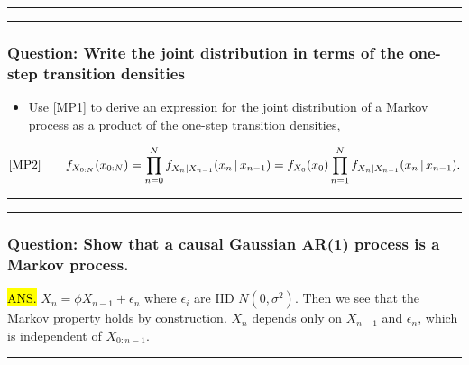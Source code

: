 \documentclass[]{article}
\providecommand{\tightlist}{%
  \setlength{\itemsep}{0pt}\setlength{\parskip}{0pt}}
\begin{document}
\begin{center}\rule{0.5\linewidth}{\linethickness}\end{center}

\begin{center}\rule{0.5\linewidth}{\linethickness}\end{center}

\subsubsection{Question: Write the joint distribution in terms of the
one-step transition
densities}\label{question-write-the-joint-distribution-in-terms-of-the-one-step-transition-densities}

\begin{itemize}
\tightlist
\item
  Use {[}MP1{]} to derive an expression for the joint distribution of a
  Markov process as a product of the one-step transition densities,
\end{itemize}

$$\text{[MP2]}
\quad\quad f_{X_{0:N}}(x_{0:N}) = \prod_{n=0}^N f_{X_n|X_{n-1}}(x_n{\, | \,} x_{n-1})=f_{X_0}(x_0)\prod_{n=1}^N f_{X_n|X_{n-1}}(x_n{\, | \,} x_{n-1}).$$


\begin{center}\rule{0.5\linewidth}{\linethickness}\end{center}

\begin{center}\rule{0.5\linewidth}{\linethickness}\end{center}

\subsubsection{Question: Show that a causal Gaussian AR(1) process is a
Markov
process.}\label{question-show-that-a-causal-gaussian-ar1-process-is-a-markov-process.}

\hl{ANS.} $X_n = \phi X_{n-1} + \epsilon_n$ where $\epsilon_i$ are IID $N(0,\sigma^2)$. Then we see that the Markov property holds by construction. $X_n$ depends only on $X_{n-1}$ and $\epsilon_n$, which is independent of $X_{0:n-1}$.

\begin{center}\rule{0.5\linewidth}{\linethickness}\end{center}
\end{document}
